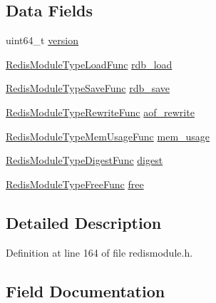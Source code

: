\subsection*{Data Fields}
\begin{DoxyCompactItemize}
\item 
uint64\+\_\+t \hyperlink{struct_redis_module_type_methods_aa38fd391d6e9522074df6743fcd3d323}{version}
\item 
\hyperlink{redismodule_8h_abc26c0647be3ba4c17bb67cbbf6a0840}{Redis\+Module\+Type\+Load\+Func} \hyperlink{struct_redis_module_type_methods_ab845ab6c05b214959d237594f3709d94}{rdb\+\_\+load}
\item 
\hyperlink{redismodule_8h_af69ba4330f4e0f07cf10321c721a32dd}{Redis\+Module\+Type\+Save\+Func} \hyperlink{struct_redis_module_type_methods_aeb7e4a91b4aadbcce3cd6437a77cbcf5}{rdb\+\_\+save}
\item 
\hyperlink{redismodule_8h_a5367d50c79d673c161a718ba3bcde693}{Redis\+Module\+Type\+Rewrite\+Func} \hyperlink{struct_redis_module_type_methods_acc6716842c42e087712dd1521692b7bb}{aof\+\_\+rewrite}
\item 
\hyperlink{redismodule_8h_a52efa69c9698bf053fdcea638922fc2a}{Redis\+Module\+Type\+Mem\+Usage\+Func} \hyperlink{struct_redis_module_type_methods_a0d0e3f0ba457ea00310871d07f907277}{mem\+\_\+usage}
\item 
\hyperlink{redismodule_8h_a44a0e6c440bd362fc5e1709964339573}{Redis\+Module\+Type\+Digest\+Func} \hyperlink{struct_redis_module_type_methods_a9404b8fe8414df37298075b8593e9622}{digest}
\item 
\hyperlink{redismodule_8h_aa8cecfc7db337e1e9a513248fbd01c4f}{Redis\+Module\+Type\+Free\+Func} \hyperlink{struct_redis_module_type_methods_a6e612ef6fa670ac9b1d4b671d3a915c5}{free}
\end{DoxyCompactItemize}


\subsection{Detailed Description}


Definition at line 164 of file redismodule.\+h.



\subsection{Field Documentation}
\mbox{\label{struct_redis_module_type_methods_acc6716842c42e087712dd1521692b7bb}} 
